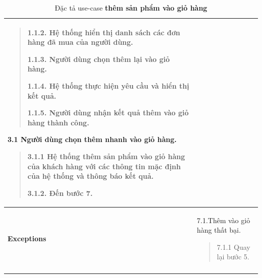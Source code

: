 {\begin{longtable}{| p{} | p{} |}
\begin{quote}
            1.1.2. Hệ thống hiển thị danh sách các đơn hàng đã mua của người dùng.

            1.1.3. Người dùng chọn thêm lại vào giỏ hàng.

            1.1.4. Hệ thống thực hiện yêu cầu và hiển thị kết quả.

            1.1.5. Người dùng nhận kết quả thêm vào giỏ hàng thành công.

        \end{quote}
        3.1 Người dùng chọn thêm nhanh vào giỏ hàng.
        \begin{quote}
            3.1.1 Hệ thống thêm sản phẩm vào giỏ hàng của khách hàng với các thông tin mặc định của hệ thống và thông báo kết quả.

            3.1.2. Đến bước 7.
        \end{quote}
        \\
        \hline
        \begin{flushleft}
            \textbf{Exceptions}
        \end{flushleft}
         &
        7.1.Thêm vào giỏ hàng thất bại.
        \begin{quote}
            7.1.1 Quay lại bước 5.
        \end{quote}
        \\
        \hline
        \caption{Đặc tả use-case \textbf{thêm sản phẩm vào giỏ hàng}}
    \end{longtable}
}



